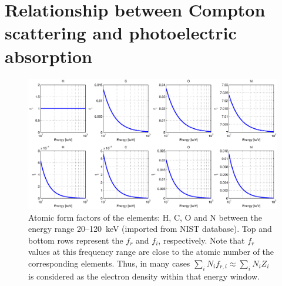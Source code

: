 \documentclass[12pt]{article}
\begin{document}
\section{Relationship between Compton scattering and photoelectric absorption}
\begin{figure}
\centering
\includegraphics[width=1\textwidth]{imgs/formFactorsHCON.eps}
\caption{Atomic form factors of the elements: H, C, O and N between the energy range 20--120~keV (imported from NIST database). Top and bottom rows represent the $f_r$ and $f_i$, respectively. Note that $f_r$ values at this frequency range are close to the atomic number of the corresponding elements. Thus, in many cases $\sum_i N_if_{r,i}\approx\sum_i N_iZ_i$ is considered as the electron density within that energy window.}
\label{formFactorsHCON}
\end{figure}
\end{document}
